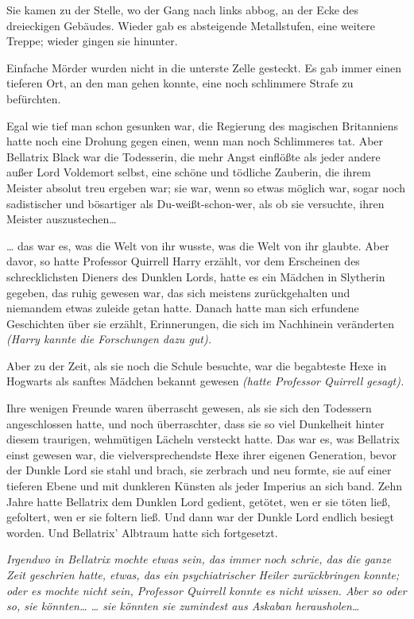 {Sie kamen zu der Stelle, wo der Gang nach links abbog, an der Ecke des dreieckigen Gebäudes. Wieder gab es absteigende Metallstufen, eine weitere Treppe; wieder gingen sie hinunter.

Einfache Mörder wurden nicht in die unterste Zelle gesteckt. Es gab immer einen tieferen Ort, an den man gehen konnte, eine noch schlimmere Strafe zu befürchten.

Egal wie tief man schon gesunken war, die Regierung des magischen Britanniens hatte noch eine Drohung gegen einen, wenn man noch Schlimmeres tat. Aber Bellatrix Black war die Todesserin, die mehr Angst einflößte als jeder andere außer Lord Voldemort selbst, eine schöne und tödliche Zauberin, die ihrem Meister absolut treu ergeben war; sie war, wenn so etwas möglich war, sogar noch sadistischer und bösartiger als Du-weißt-schon-wer, als ob sie versuchte, ihren Meister auszustechen…

… das war es, was die Welt von ihr wusste, was die Welt von ihr glaubte. Aber davor, so hatte Professor Quirrell Harry erzählt, vor dem Erscheinen des schrecklichsten Dieners des Dunklen Lords, hatte es ein Mädchen in Slytherin gegeben, das ruhig gewesen war, das sich meistens zurückgehalten und niemandem etwas zuleide getan hatte. Danach hatte man sich erfundene Geschichten über sie erzählt, Erinnerungen, die sich im Nachhinein veränderten \emph{(Harry kannte die Forschungen dazu gut).}

Aber zu der Zeit, als sie noch die Schule besuchte, war die begabteste Hexe in Hogwarts als sanftes Mädchen bekannt gewesen \emph{(hatte Professor Quirrell gesagt).}

Ihre wenigen Freunde waren überrascht gewesen, als sie sich den Todessern angeschlossen hatte, und noch überraschter, dass sie so viel Dunkelheit hinter diesem traurigen, wehmütigen Lächeln versteckt hatte. Das war es, was Bellatrix einst gewesen war, die vielversprechendste Hexe ihrer eigenen Generation, bevor der Dunkle Lord sie stahl und brach, sie zerbrach und neu formte, sie auf einer tieferen Ebene und mit dunkleren Künsten als jeder Imperius an sich band. Zehn Jahre hatte Bellatrix dem Dunklen Lord gedient, getötet, wen er sie töten ließ, gefoltert, wen er sie foltern ließ. Und dann war der Dunkle Lord endlich besiegt worden. Und Bellatrix' Albtraum hatte sich fortgesetzt.

\emph{Irgendwo in Bellatrix mochte etwas sein, das immer noch schrie, das die ganze Zeit geschrien hatte, etwas, das ein psychiatrischer Heiler zurückbringen konnte; oder es mochte nicht sein, Professor Quirrell konnte es nicht wissen. Aber so oder so, sie könnten… … sie könnten sie zumindest aus Askaban herausholen…}

}
